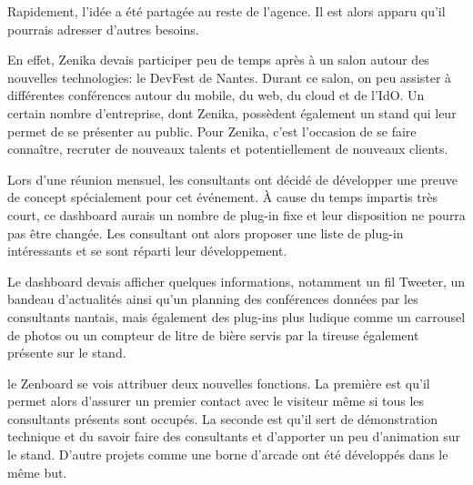 Rapidement, l'idée a été partagée au reste de l'agence. Il est alors apparu qu'il pourrais adresser d'autres besoins. 

En effet, Zenika devais participer peu de temps après à un salon autour des nouvelles technologies: le DevFest de Nantes. Durant ce salon, on peu assister à différentes conférences autour du mobile, du web, du cloud et de l'\gls{IdO}. Un certain nombre d'entreprise, dont Zenika, possèdent également un stand qui leur permet de se présenter au public. Pour Zenika, c'est l'occasion de se faire connaître, recruter de nouveaux talents et potentiellement de nouveaux clients.

Lors d'une réunion mensuel, les consultants ont décidé de développer une preuve de concept spécialement pour cet événement. À cause du temps impartis très court, ce dashboard aurais un nombre de plug-in fixe et leur disposition ne pourra pas être changée. Les consultant ont alors proposer une liste de plug-in intéressants et se sont réparti leur développement.

Le dashboard devais afficher quelques informations, notamment un fil Tweeter, un bandeau d'actualités ainsi qu'un planning des conférences données par les consultants nantais, mais également des plug-ins plus ludique comme un carrousel de photos ou un compteur de litre de bière servis par la tireuse également présente sur le stand.

le Zenboard se vois attribuer deux nouvelles fonctions. La première est qu'il permet alors d'assurer un premier contact avec le visiteur même si tous les consultants présents sont occupés. La seconde est qu'il sert de démonstration technique et du savoir faire des consultants et d'apporter un peu d'animation sur le stand. D'autre projets comme une borne d'arcade ont été développés dans le même but.

\clearpage